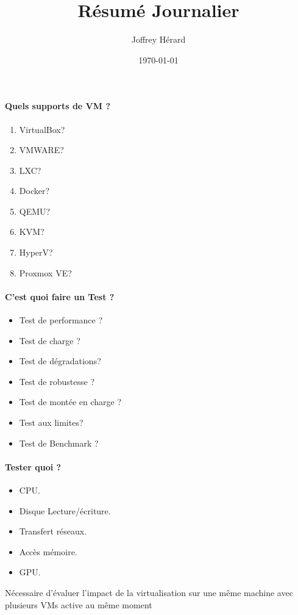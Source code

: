 \documentclass[french]{article}
\begin{document}
\title{Résumé Journalier}
\author{Joffrey Hérard}
\date{\today} 

\maketitle

\paragraph{Quels supports de VM ?}
\begin{enumerate}
	\item VirtualBox?
	\item VMWARE?
	\item LXC?
	\item Docker?
	\item QEMU?
	\item KVM?
	\item HyperV?
	\item Proxmox VE?
\end{enumerate}

\paragraph{C'est quoi faire un Test ? }
\begin{itemize}
\item Test de performance ? 
\item Test de charge ? 
\item Test de dégradations?
\item Test de robustesse ?
\item Test de montée en charge ?
\item Test aux limites?
\item Test de Benchmark ?
\end{itemize}

\paragraph{Tester quoi ?}
\begin{itemize}
	\item CPU.
	\item Disque Lecture/écriture.
	\item Transfert réseaux.
	\item Accès mémoire.
	\item GPU.  
\end{itemize}
Nécessaire d'évaluer l'impact de la virtualisation sur une même machine avec plusieurs VMs active au même moment 
\end{document}
